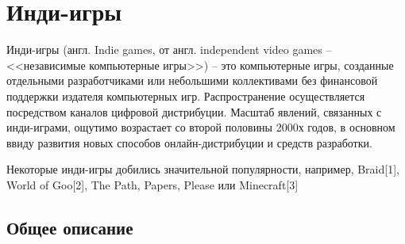 
\chapter{Инди-игры}

Инди-игры (англ. Indie games, от англ. independent video games -- <<независимые компьютерные игры>>) -- это 
компьютерные игры, созданные отдельными разработчиками или небольшими коллективами без финансовой поддержки 
издателя компьютерных игр. Распространение осуществляется посредством каналов цифровой дистрибуции. Масштаб 
явлений, связанных с инди-играми, ощутимо возрастает со второй половины 2000х годов, в основном ввиду 
развития новых способов онлайн-дистрибуции и средств разработки.

Некоторые инди-игры добились значительной популярности, например, Braid[1], World of Goo[2], The Path, 
Papers, Please или Minecraft[3]

\section{Общее описание}

